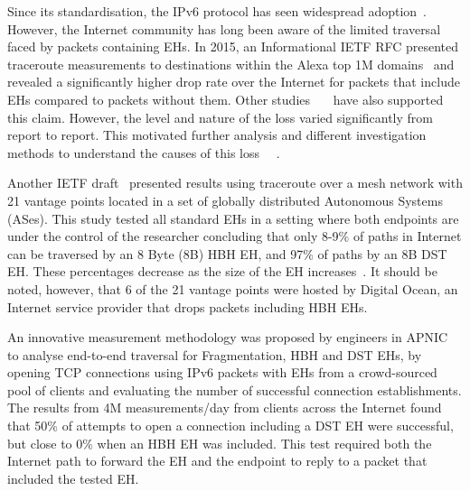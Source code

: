 \documentclass[conference]{IEEEtran}
\begin{document}
\label{sec:motivation}

Since its standardisation, the IPv6 protocol has seen
widespread adoption~\cite{v6adoption_ton}. However,
the Internet community has long been aware of the limited traversal faced
by packets containing EHs.  In 2015, an Informational IETF RFC presented
traceroute measurements to destinations within the Alexa top 1M
domains~\cite{RFC7872} and revealed a significantly higher drop rate over the Internet for
packets that include EHs compared to packets without them.
Other studies~\cite{james}~\cite{nalini-iepg114}~\cite{apnic} have also
supported this claim.  However, the level and nature of the loss varied
significantly from report to report. This motivated further analysis and
different investigation methods to understand the causes of this loss
~\cite{james}~\cite{elkins-v6ops-eh-deepdive-fw-01}.  

Another IETF draft~\cite{james} presented results using traceroute over a
mesh network with 21 vantage points located in a set of globally distributed
Autonomous Systems (ASes). This study tested all standard EHs in a setting
where both endpoints are under the control of the researcher concluding that
only 8-9\% of paths in Internet can be traversed by an 8 Byte (8B) HBH EH, and 97\% of paths by an 8B DST EH.  These percentages decrease as the
size of the EH increases~\cite{james-imc}. It should be noted, however, that 6
of the 21 vantage points were hosted by Digital Ocean\texttrademark, an
Internet service provider that drops packets including HBH EHs.

An innovative measurement methodology was proposed by engineers in
APNIC~\cite{apnic} to analyse end-to-end traversal for Fragmentation, HBH and
DST EHs, by opening TCP connections using IPv6 packets
with EHs from a crowd-sourced pool of clients and evaluating the number of
successful connection establishments.  The results from 4M
measurements/day from clients across the Internet found that 50\%  of
attempts to open a connection including a DST EH were successful, but close to 0\%
when an HBH EH was included.  This test
required both the Internet path to forward the EH and the endpoint to reply to
a packet that included the tested EH. 

\end{document}
